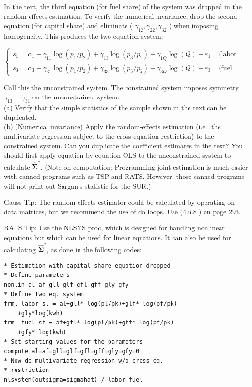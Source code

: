 \documentclass[10pt]{article}
\begin{document}
In the text, the third equation (for fuel share) of the system was dropped in the random-effects estimation. To verify the numerical invariance, drop the second equation (for capital share) and eliminate ( $\gamma_{12}, \gamma_{22}, \gamma_{32}$ ) when imposing homogeneity. This produces the two-equation system:

$$
\begin{cases}s_{1}=\alpha_{1}+\gamma_{11} \log \left(p_{1} / p_{2}\right)+\gamma_{13} \log \left(p_{3} / p_{2}\right)+\gamma_{1 Q} \log (Q)+\varepsilon_{1} & \text { (labor share), } \\ s_{3}=\alpha_{3}+\gamma_{31} \log \left(p_{1} / p_{2}\right)+\gamma_{33} \log \left(p_{3} / p_{2}\right)+\gamma_{3 Q} \log (Q)+\varepsilon_{3} & \text { (fuel share). }\end{cases}
$$

Call this the unconstrained system. The constrained system imposes symmetry $\gamma_{13}=\gamma_{31}$ on the unconstrained system.\\
(a) Verify that the simple statistics of the sample shown in the text can be duplicated.\\
(b) (Numerical invariance) Apply the random-effects estimation (i.e., the multivariate regression subject to the cross-equation restriction) to the constrained system. Can you duplicate the coefficient estimates in the text? You should first apply equation-by-equation OLS to the unconstrained system to calculate $\widehat{\mathbf{\Sigma}}^{*}$. (Note on computation: Programming joint estimation is much easier with canned programs such as TSP and RATS. However, those canned programs will not print out Sargan's statistic for the SUR.)

Gauss Tip: The random-effects estimator could be calculated by operating on data matrices, but we recommend the use of do loops. Use (4.6.8') on page 293.

RATS Tip: Use the NLSYS proc, which is designed for handling nonlinear equations but which can be used for linear equations. It can also be used for calculating $\widehat{\mathbf{\Sigma}}^{*}$, as done in the following codes:

\begin{verbatim}
* Estimation with capital share equation dropped
* Define parameters
nonlin al af gll glf gfl gff gly gfy
* Define two eq. system
frml labor sl = al+gll* log(pl/pk)+glf* log(pf/pk)
    +gly*log(kwh)
frml fuel sf = af+gfl* log(pl/pk)+gff* log(pf/pk)
    +gfy* log(kwh)
* Set starting values for the parameters
compute al=af=gll=glf=gfl=gff=gly=gfy=0
* Now do multivariate regression w/o cross-eq.
* restriction
nlsystem(outsigma=sigmahat) / labor fuel
\end{verbatim}
\end{document}
